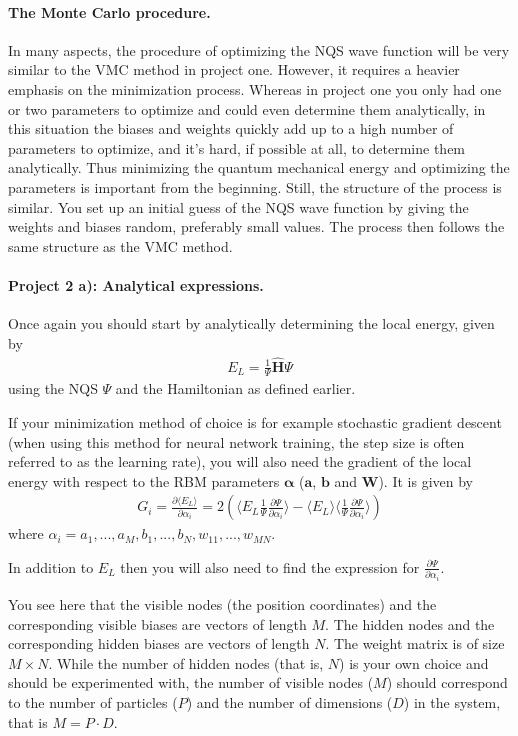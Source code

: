 \documentclass[%
oneside,                 %
final,                   %
10pt]{article}
\begin{document}
\paragraph{The Monte Carlo procedure.}
In many aspects, the procedure of optimizing the NQS wave function
will be very similar to the VMC method in project one. However, it
requires a heavier emphasis on the minimization process. Whereas in
project one you only had one or two parameters to optimize and could
even determine them analytically, in this situation the biases and
weights quickly add up to a high number of parameters to optimize, and
it's hard, if possible at all, to determine them analytically. Thus
minimizing the quantum mechanical energy and optimizing the parameters
is important from the beginning. Still, the structure of the process
is similar. You set up an initial guess of the NQS wave function by
giving the weights and biases random, preferably small values. The
process then follows the same structure as the VMC method.


\paragraph{Project 2 a): Analytical expressions.}
Once again you should start by analytically determining the local energy, given by
\begin{align}
	E_L = \frac{1}{\Psi} \hat{\mathbf{H}} \Psi
\end{align}
using the NQS $\Psi$ and the Hamiltonian as defined earlier.

If your minimization method of choice is for example stochastic gradient descent (when using this method for neural network training, the step size is often referred to as the learning rate), you will also need the gradient of the local energy with respect to the RBM parameters $\mathbf{\alpha}$ ($\mathbf{a}$, $\mathbf{b}$ and $\mathbf{W}$). It is given by
\begin{align}
	G_i = \frac{\partial \langle E_L \rangle}{\partial \alpha_i}
	= 2(\langle E_L \frac{1}{\Psi}\frac{\partial \Psi}{\partial \alpha_i} \rangle - \langle E_L \rangle \langle \frac{1}{\Psi}\frac{\partial \Psi}{\partial \alpha_i} \rangle )
\end{align}
where $\alpha_i = a_1,...,a_M,b_1,...,b_N,w_{11},...,w_{MN}$.

In addition to $E_L$ then you will also need to find the expression for
$\frac{\partial \Psi}{\partial \alpha_i}$.

You see here that the visible nodes (the position coordinates) and the corresponding visible biases are vectors of length $M$. The hidden nodes and the corresponding hidden biases are vectors of length $N$. The weight matrix is of size $M\times N$. While the number of hidden nodes (that is, $N$) is your own choice and should be experimented with, the number of visible nodes ($M$) should correspond to the number of particles ($P$) and the number of dimensions ($D$) in the system, that is $M = P \cdot D$.
\end{document}
